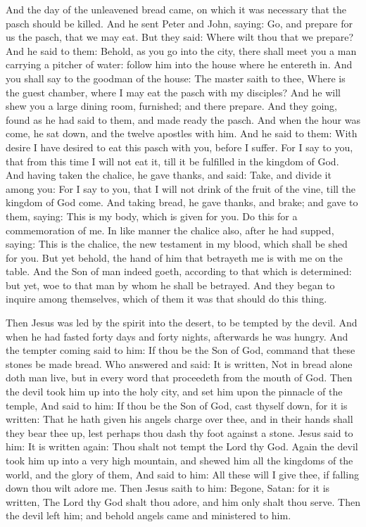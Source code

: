 \begin{multicols}{2}
And the day of the unleavened bread came, on which it was necessary that the pasch should be killed. And he sent Peter
and John, saying: Go, and prepare for us the pasch, that we may eat. But they said: Where wilt thou that we prepare?
And he said to them: Behold, as you go into the city, there shall meet you a man carrying a pitcher of water: follow
him into the house where he entereth in. And you shall say to the goodman of the house: The master saith to thee, Where
is the guest chamber, where I may eat the pasch with my disciples? And he will shew you a large dining room, furnished;
and there prepare. And they going, found as he had said to them, and made ready the pasch. And when the hour was come,
he sat down, and the twelve apostles with him. And he said to them: With desire I have desired to eat this pasch with
you, before I suffer. For I say to you, that from this time I will not eat it, till it be fulfilled in the kingdom of
God. And having taken the chalice, he gave thanks, and said: Take, and divide it among you: For I say to you, that I
will not drink of the fruit of the vine, till the kingdom of God come. And taking bread, he gave thanks, and brake; and
gave to them, saying: This is my body, which is given for you. Do this for a commemoration of me. In like manner the
chalice also, after he had supped, saying: This is the chalice, the new testament in my blood, which shall be shed for
you. But yet behold, the hand of him that betrayeth me is with me on the table. And the Son of man indeed goeth,
according to that which is determined: but yet, woe to that man by whom he shall be betrayed. And they began to inquire
among themselves, which of them it was that should do this thing. 

Then Jesus was led by the spirit into the desert, to be tempted by the devil. And when he had fasted forty days and
forty nights, afterwards he was hungry. And the tempter coming said to him: If thou be the Son of God, command that
these stones be made bread. Who answered and said: It is written, Not in bread alone doth man live, but in every word
that proceedeth from the mouth of God. Then the devil took him up into the holy city, and set him upon the pinnacle of
the temple, And said to him: If thou be the Son of God, cast thyself down, for it is written: That he hath given his
angels charge over thee, and in their hands shall they bear thee up, lest perhaps thou dash thy foot against a stone.
Jesus said to him: It is written again: Thou shalt not tempt the Lord thy God. Again the devil took him up into a very
high mountain, and shewed him all the kingdoms of the world, and the glory of them, And said to him: All these will I
give thee, if falling down thou wilt adore me. Then Jesus saith to him: Begone, Satan: for it is written, The Lord thy
God shalt thou adore, and him only shalt thou serve. Then the devil left him; and behold angels came and ministered to
him. 
\end{multicols}

